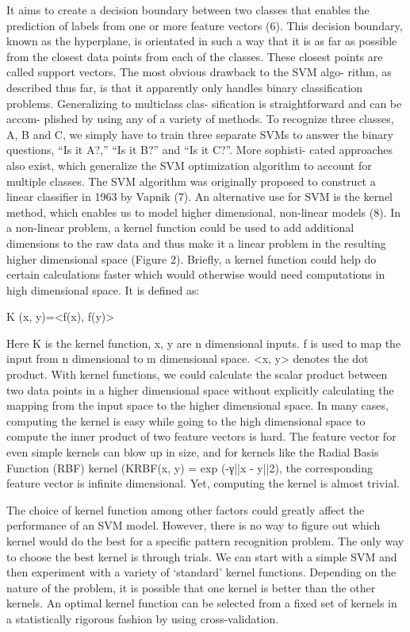 It aims to create a decision boundary between two classes that enables the prediction of labels from one or more feature vectors (6). This decision boundary, known as the hyperplane, is orientated in such a way that it is as far as possible from the closest data points from each of the classes. These closest points are called support vectors.
The most obvious drawback to the SVM algo- rithm, as described thus far, is that it apparently only handles binary classification problems. 
Generalizing to multiclass clas- sification is straightforward and can be accom- plished by using any of a variety of methods. To recognize three classes, A, B and C, we simply have to train three separate SVMs to answer the binary questions, “Is it A?,” “Is it B?” and “Is it C?”. More sophisti- cated approaches also exist, which generalize the SVM optimization algorithm to account for multiple classes. \cite{noble2006support}
The SVM algorithm was originally proposed to construct a linear classifier in 1963 by Vapnik (7). An alternative use for SVM is the kernel method, which enables us to model higher dimensional, non-linear models (8). In a non-linear problem, a kernel function could be used to add additional dimensions to the raw data and thus make it a linear problem in the resulting higher dimensional space (Figure 2). Briefly, a kernel function could help do certain calculations faster which would otherwise would need computations in high dimensional space.
It is defined as:

K (x, y)=<f(x), f(y)>

Here K is the kernel function, x, y are n dimensional inputs. f is used to map the input from n dimensional to m dimensional space. <x, y> denotes the dot product. With kernel functions, we could calculate the scalar product between two data points in a higher dimensional space without explicitly calculating the mapping from the input space to the higher dimensional space. In many cases, computing the kernel is easy while going to the high dimensional space to compute the inner product of two feature vectors is hard. The feature vector for even simple kernels can blow up in size, and for kernels like the Radial Basis Function (RBF) kernel (KRBF(x, y) = exp (-γ||x - y||2), the corresponding feature vector is infinite dimensional. Yet, computing the kernel is almost trivial.

The choice of kernel function among other factors could greatly affect the performance of an SVM model. However, there is no way to figure out which kernel would do the best for a specific pattern recognition problem. The only way to choose the best kernel is through trials. We can start with a simple SVM and then experiment with a variety of ‘standard’ kernel functions. Depending on the nature of the problem, it is possible that one kernel is better than the other kernels. An optimal kernel function can be selected from a fixed set of kernels in a statistically rigorous fashion by using cross-validation.

